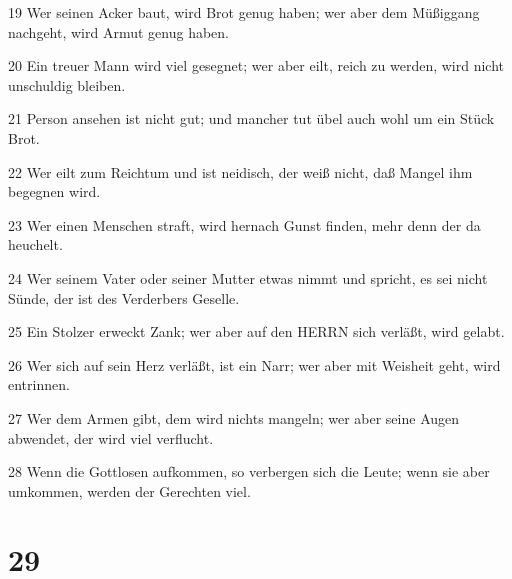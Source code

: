 \par 19 Wer seinen Acker baut, wird Brot genug haben; wer aber dem Müßiggang nachgeht, wird Armut genug haben.
\par 20 Ein treuer Mann wird viel gesegnet; wer aber eilt, reich zu werden, wird nicht unschuldig bleiben.
\par 21 Person ansehen ist nicht gut; und mancher tut übel auch wohl um ein Stück Brot.
\par 22 Wer eilt zum Reichtum und ist neidisch, der weiß nicht, daß Mangel ihm begegnen wird.
\par 23 Wer einen Menschen straft, wird hernach Gunst finden, mehr denn der da heuchelt.
\par 24 Wer seinem Vater oder seiner Mutter etwas nimmt und spricht, es sei nicht Sünde, der ist des Verderbers Geselle.
\par 25 Ein Stolzer erweckt Zank; wer aber auf den HERRN sich verläßt, wird gelabt.
\par 26 Wer sich auf sein Herz verläßt, ist ein Narr; wer aber mit Weisheit geht, wird entrinnen.
\par 27 Wer dem Armen gibt, dem wird nichts mangeln; wer aber seine Augen abwendet, der wird viel verflucht.
\par 28 Wenn die Gottlosen aufkommen, so verbergen sich die Leute; wenn sie aber umkommen, werden der Gerechten viel.

\chapter{29}

